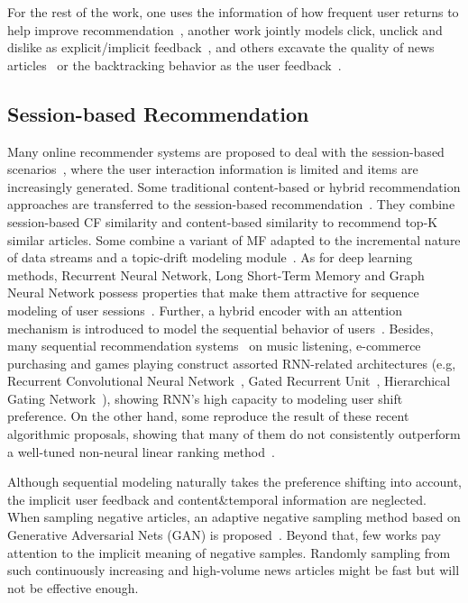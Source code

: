 For the rest of the work, one uses the information of how frequent user returns to help improve recommendation~\cite{zheng2018drn}, another work jointly models click, unclick and dislike as explicit/implicit feedback~\cite{xie2020deep}, and others excavate the quality of news articles~\cite{lu_quality_2019} or the backtracking behavior as the user feedback~\cite{smadja_understanding_2019}.
\subsection{Session-based Recommendation}
Many online recommender systems are proposed to deal with the session-based scenarios~\cite{epure_recommending_2017,zhou_variational_2019}, where the user interaction information is limited and items are increasingly generated. Some traditional content-based or hybrid recommendation approaches are transferred to the session-based recommendation~\cite{sottocornola2018session}.  They combine session-based CF similarity and content-based similarity to recommend top-K similar articles. Some combine a variant of MF adapted to the incremental nature of data streams and a topic-drift modeling module~\cite{al2018adaptive}. As for deep learning methods, Recurrent Neural Network, Long Short-Term Memory and Graph Neural Network possess properties that make them attractive for sequence modeling of user sessions~\cite{guo_streaming_2019,hidasi2015session,wang2019modeling,gabriel2019contextual,wu2019session}. Further, a hybrid encoder with an attention mechanism is introduced to model the sequential behavior of users~\cite{li2017neural,liu2018stamp,xu2019time,song_islf_2019,zhang_feature-level_2019}. 
Besides, many sequential recommendation systems~\cite{pereira2019online,xu2019graph} on music listening, e-commerce purchasing and games playing construct assorted RNN-related architectures (e.g, Recurrent Convolutional Neural Network~\cite{xu_recurrent_2019}, Gated Recurrent Unit~\cite{hidasi2018recurrent}, Hierarchical Gating Network~\cite{xiao2019hierarchical,ma2019hierarchical}), showing RNN's high capacity to modeling user shift preference. On the other hand, some reproduce the result of these recent algorithmic proposals, showing that many of them do not consistently outperform a well-tuned non-neural linear ranking method~\cite{dacrema_are_2019,ludewig_performance_2019}.

Although sequential modeling naturally takes the preference shifting into account, the implicit user feedback and content\&temporal information are neglected. When sampling negative articles, an adaptive negative sampling method based on Generative Adversarial Nets (GAN) is proposed~\cite{wang_neural_2018}. Beyond that, few works pay attention to the implicit meaning of negative samples. Randomly sampling from such continuously increasing and high-volume news articles might be fast but will not be effective enough.

